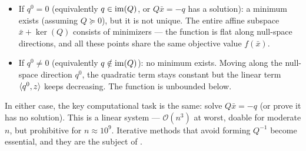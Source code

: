 \begin{itemize}
	\item If $q^0 = 0$ (equivalently $q \in \operatorname{im}(Q)$, or $Q\bar{x} = -q$ has a solution): a minimum exists (assuming $Q \succeq 0$), but it is not unique.
		The entire affine subspace $\bar{x} + \ker(Q)$ consists of minimizers --- the function is flat along null-space directions, and all these points share the same objective value $f(\bar{x})$.
	\item If $q^0 \neq 0$ (equivalently $q \notin \operatorname{im}(Q)$): no minimum exists.
		Moving along the null-space direction $q^0$, the quadratic term stays constant but the linear term $\langle q^0, z\rangle$ keeps decreasing.
		The function is unbounded below.
\end{itemize}

In either case, the key computational task is the same: solve $Q\bar{x} = -q$ (or prove it has no solution).
This is a linear system --- $\mathcal{O}(n^3)$ at worst, doable for moderate $n$, but prohibitive for $n \approx 10^9$.
Iterative methods that avoid forming $Q^{-1}$ become essential, and they are the subject of .